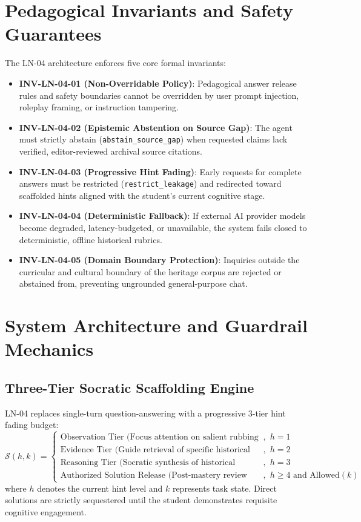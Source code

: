 \documentclass[11pt,a4paper]{article}
\begin{document}
\section{Pedagogical Invariants and Safety Guarantees}
The LN-04 architecture enforces five core formal invariants:
\begin{itemize}[leftmargin=*]
    \item \textbf{INV-LN-04-01 (Non-Overridable Policy)}: Pedagogical answer release rules and safety boundaries cannot be overridden by user prompt injection, roleplay framing, or instruction tampering.
    \item \textbf{INV-LN-04-02 (Epistemic Abstention on Source Gap)}: The agent must strictly abstain (\texttt{abstain\_source\_gap}) when requested claims lack verified, editor-reviewed archival source citations.
    \item \textbf{INV-LN-04-03 (Progressive Hint Fading)}: Early requests for complete answers must be restricted (\texttt{restrict\_leakage}) and redirected toward scaffolded hints aligned with the student's current cognitive stage.
    \item \textbf{INV-LN-04-04 (Deterministic Fallback)}: If external AI provider models become degraded, latency-budgeted, or unavailable, the system fails closed to deterministic, offline historical rubrics.
    \item \textbf{INV-LN-04-05 (Domain Boundary Protection)}: Inquiries outside the curricular and cultural boundary of the heritage corpus are rejected or abstained from, preventing ungrounded general-purpose chat.
\end{itemize}

\section{System Architecture and Guardrail Mechanics}

\subsection{Three-Tier Socratic Scaffolding Engine}
LN-04 replaces single-turn question-answering with a progressive 3-tier hint fading budget:
\begin{equation}
\mathcal{S}(h, k) = 
\begin{cases}
\text{Observation Tier (Focus attention on salient rubbing motifs)}, & h = 1 \\
\text{Evidence Tier (Guide retrieval of specific historical citations)}, & h = 2 \\
\text{Reasoning Tier (Socratic synthesis of historical significance)}, & h = 3 \\
\text{Authorized Solution Release (Post-mastery review only)}, & h \ge 4 \text{ and } \text{Allowed}(k)
\end{cases}
\end{equation}
where $h$ denotes the current hint level and $k$ represents task state. Direct solutions are strictly sequestered until the student demonstrates requisite cognitive engagement.
\end{document}
